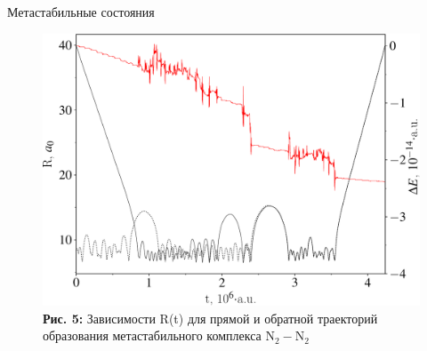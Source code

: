 \documentclass[10pt,usenames,pdf,hyperref={unicode},dvipsnames]{beamer}
\newcommand{\mycaption}[2]{
    \textbf{#1:} #2
}
\begin{document}
\begin{frame}{Метастабильные состояния}
    \vspace*{-0.5cm}
    \begin{figure}[H]
        \includegraphics[width=0.8\linewidth]{./pictures/euler_trajectory-crop.pdf} \\
        \mycaption{Рис. 5}{Зависимости R(t) для прямой и обратной траекторий образования метастабильного комплекса N$_2-$N$_2$}
    \end{figure}
\end{frame}
\end{document}
